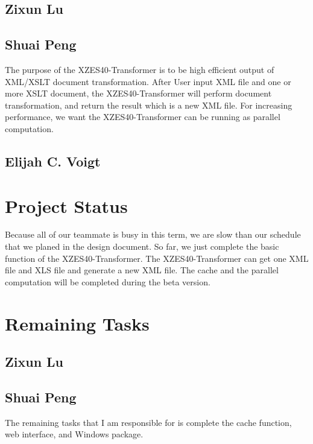 \subsection{Zixun Lu}

\subsection{Shuai Peng}
The purpose of the XZES40-Transformer is to be high efficient output of XML/XSLT document transformation.
After User input XML file and one or more XSLT document, the XZES40-Transformer will perform document transformation, and return the result which is a new XML file.
For increasing performance, we want the XZES40-Transformer can be running as parallel computation.

\subsection{Elijah C. Voigt}

\section{Project Status}
Because all of our teammate is busy in this term, we are slow than our schedule that we planed in the design document. 
So far, we just complete the basic function of the XZES40-Transformer. The XZES40-Transformer can get one XML file and XLS file and generate a new XML file.
The cache and the parallel computation will be completed during the beta version.  

\section{Remaining Tasks}

\subsection{Zixun Lu}

\subsection{Shuai Peng}
The remaining tasks that I am responsible for is complete the cache function, web interface, and Windows package.

